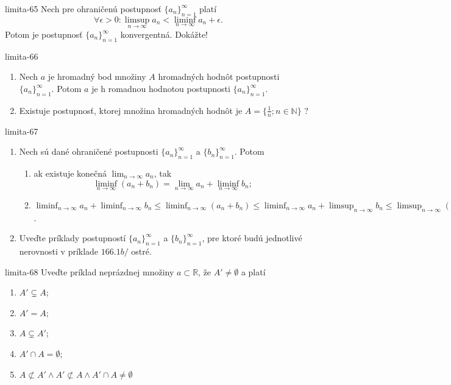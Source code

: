 \begin{defproblem}{limita-65}
Nech pre ohraničenú postupnosť ${\{a_n\}}_{n=1}^\infty$ platí $$\forall \epsilon > 0: \limsup_{n \rightarrow \infty} a_n < \liminf_{n \rightarrow \infty} a_n+\epsilon.$$ Potom je postupnosť ${\{a_n\}}_{n=1}^\infty$ konvergentná. Dokážte!
\end{defproblem}

\begin{defproblem}{limita-66}
\begin{enumerate}
\item Nech $a$ je hromadný bod množiny $A$ hromadných hodnôt postupnosti ${\{a_n\}}_{n=1}^\infty$. Potom $a$ je h romadnou hodnotou postupnosti ${\{a_n\}}_{n=1}^\infty$.
\item Existuje postupnosť, ktorej množina hromadných hodnôt je $A=\{ \frac{1}{n}; n \in \mathbb{N} \}$ ?
\end{enumerate}
\end{defproblem}

\begin{defproblem}{limita-67}
\begin{enumerate}
\item Nech sú dané ohraničené postupnosti ${\{a_n\}}_{n=1}^\infty$ a ${\{b_n\}}_{n=1}^\infty$. Potom
\begin{enumerate}
\item ak existuje konečná $\lim_{n \rightarrow \infty} a_n$, tak
$$\liminf_{n \rightarrow \infty} (a_n+b_n)=\lim_{n \rightarrow \infty} a_n+\liminf_{n \rightarrow \infty} b_n;$$
\item $\liminf_{n \rightarrow \infty} a_n+\liminf_{n \rightarrow \infty} b_n \leq \liminf_{n \rightarrow \infty} (a_n+b_n)\leq \liminf_{n \rightarrow \infty} a_n+\limsup_{n \rightarrow \infty} b_n\leq \limsup_{n \rightarrow \infty} (a_n+b_n) \leq \limsup_{n \rightarrow \infty} a_n+\limsup_{n \rightarrow \infty} b_n$.
\end{enumerate}
\item Uveďte príklady postupností ${\{a_n\}}_{n=1}^\infty$ a ${\{b_n\}}_{n=1}^\infty$, pre ktoré budú jednotlivé nerovnosti v príklade $166.1b/$ ostré.
\end{enumerate}
\end{defproblem}

\begin{defproblem}{limita-68}
Uveďte príklad neprázdnej množiny $a \subset \mathbb{R}$, že $A' \neq \emptyset$ a platí
\begin{enumerate}
\item $A' \subsetneq A$;
\item $A'=A$;
\item $A \subsetneq A'$;
\item $A' \cap A = \emptyset$;
\item $A \not\subset A'\wedge A' \not\subset A \wedge A' \cap A \neq\emptyset$
\end{enumerate}
\end{defproblem}

